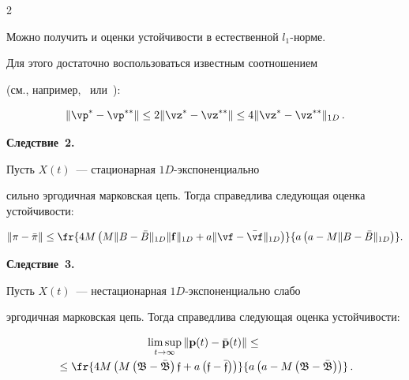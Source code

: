 \begin{multicols}{2}
\medskip



Можно получить и оценки устойчивости в естественной $l_1$-нор\-ме.

Для этого достаточно воспользоваться известным соотношением

(см., например,~\cite{gz04} или~\cite{z06}):

$$\|\vp^*-\vp^{**}\| \le 2 \|\vz^*-\vz^{**}\| \le 4\|\vz^*-\vz^{**}\|_{1D}\,.

$$





\medskip



\noindent

\textbf{Следствие~2.}\

Пусть  $X(t)$~--- стационарная $1D$-экс\-по\-нен\-ци\-аль\-но

сильно эргодичная марковская цепь. Тогда справедлива следующая оценка устойчи\-вости:

\begin{equation*}

 \|{\bf \pi}- {\bar{\bf \pi}}\| \le

\fr{4M\left(M\| B -\bar{B}\|_{1D} \|{\bf f}\|_{1D}  + a\|\vf -\bar{\vf}\|_{1D}\right)}{a\left(a - M\|B -\bar{B}\|_{1D}\right)}.


\end{equation*}



\medskip



\noindent

\textbf{Следствие~3.}\

Пусть  $X(t)$~--- нестационарная  $1D$-экс\-по\-нен\-ци\-аль\-но слабо

эргодичная марковская цепь. Тогда справедлива следующая оценка устойчи\-вости:

\begin{multline*}

\limsup\limits_{t \to \infty}   \|{\bf p}(t)- {\bar{\bf p}}(t)\| \le{}\\

{}\le

\fr{4M\left(M\left(\mathfrak{B-\bar{B}}\right) \mathfrak{f}  + a\left(\mathfrak{f-\bar{f}}\right)\right)}

{a\left(a - M\left(\mathfrak{B-\bar{B}}\right)\right)}\,.



\end{multline*}
\end{multicols}
